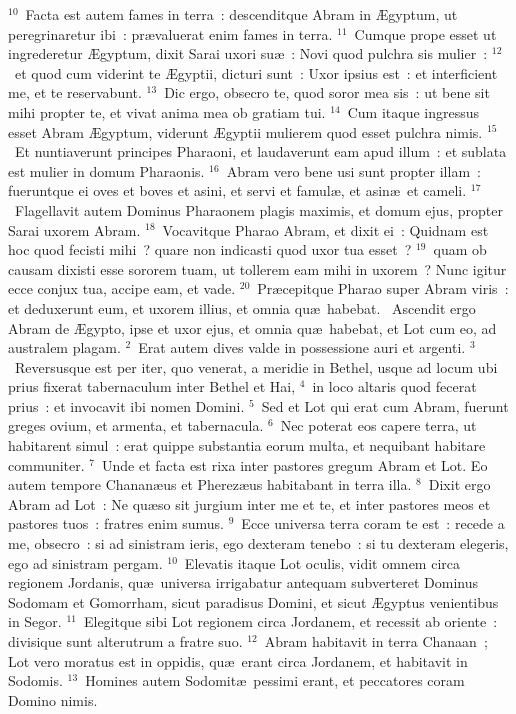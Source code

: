 ${}^{10}$~Facta est autem fames in terra~: descenditque Abram in \AE gyptum, ut peregrinaretur ibi~: pr\ae valuerat enim fames in terra.
${}^{11}$~Cumque prope esset ut ingrederetur \AE gyptum, dixit Sarai uxori su\ae~: Novi quod pulchra sis mulier~:
${}^{12}$~et quod cum viderint te \AE gyptii, dicturi sunt~: Uxor ipsius est~: et interficient me, et te reservabunt.
${}^{13}$~Dic ergo, obsecro te, quod soror mea sis~: ut bene sit mihi propter te, et vivat anima mea ob gratiam tui.
${}^{14}$~Cum itaque ingressus esset Abram \AE gyptum, viderunt \AE gyptii mulierem quod esset pulchra nimis.
${}^{15}$~Et nuntiaverunt principes Pharaoni, et laudaverunt eam apud illum~: et sublata est mulier in domum Pharaonis.
${}^{16}$~Abram vero bene usi sunt propter illam~: fueruntque ei oves et boves et asini, et servi et famul\ae , et asin\ae\ et cameli.
${}^{17}$~Flagellavit autem Dominus Pharaonem plagis maximis, et domum ejus, propter Sarai uxorem Abram.
${}^{18}$~Vocavitque Pharao Abram, et dixit ei~: Quidnam est hoc quod fecisti mihi~? quare non indicasti quod uxor tua esset~?
${}^{19}$~quam ob causam dixisti esse sororem tuam, ut tollerem eam mihi in uxorem~? Nunc igitur ecce conjux tua, accipe eam, et vade.
${}^{20}$~Pr\ae cepitque Pharao super Abram viris~: et deduxerunt eum, et uxorem illius, et omnia qu\ae\ habebat.
~Ascendit ergo Abram de \AE gypto, ipse et uxor ejus, et omnia qu\ae\ habebat, et Lot cum eo, ad australem plagam.
${}^{2}$~Erat autem dives valde in possessione auri et argenti.
${}^{3}$~Reversusque est per iter, quo venerat, a meridie in Bethel, usque ad locum ubi prius fixerat tabernaculum inter Bethel et Hai,
${}^{4}$~in loco altaris quod fecerat prius~: et invocavit ibi nomen Domini.
${}^{5}$~Sed et Lot qui erat cum Abram, fuerunt greges ovium, et armenta, et tabernacula.
${}^{6}$~Nec poterat eos capere terra, ut habitarent simul~: erat quippe substantia eorum multa, et nequibant habitare communiter.
${}^{7}$~Unde et facta est rixa inter pastores gregum Abram et Lot. Eo autem tempore Chanan\ae us et Pherez\ae us habitabant in terra illa.
${}^{8}$~Dixit ergo Abram ad Lot~: Ne qu\ae so sit jurgium inter me et te, et inter pastores meos et pastores tuos~: fratres enim sumus.
${}^{9}$~Ecce universa terra coram te est~: recede a me, obsecro~: si ad sinistram ieris, ego dexteram tenebo~: si tu dexteram elegeris, ego ad sinistram pergam.
${}^{10}$~Elevatis itaque Lot oculis, vidit omnem circa regionem Jordanis, qu\ae\ universa irrigabatur antequam subverteret Dominus Sodomam et Gomorrham, sicut paradisus Domini, et sicut \AE gyptus venientibus in Segor.
${}^{11}$~Elegitque sibi Lot regionem circa Jordanem, et recessit ab oriente~: divisique sunt alterutrum a fratre suo.
${}^{12}$~Abram habitavit in terra Chanaan~; Lot vero moratus est in oppidis, qu\ae\ erant circa Jordanem, et habitavit in Sodomis.
${}^{13}$~Homines autem Sodomit\ae\ pessimi erant, et peccatores coram Domino nimis.



